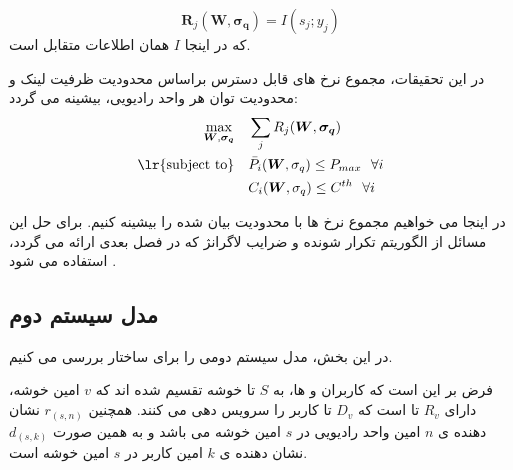 \begin{equation}
\boldsymbol{R}_j (\boldsymbol{W},\boldsymbol{\sigma_q})=I(s_j;y_j) 
\end{equation}
که در اینجا 
$I$
همان اطلاعات متقابل است.


 در این تحقیقات، مجموع نرخ های قابل دسترس براساس محدودیت ظرفیت لینک  و محدودیت توان هر واحد رادیویی، بیشینه می گردد:
\begin{equation}
\begin{aligned}
\max\limits_{\boldsymbol{W},\boldsymbol{\sigma_q}}   \quad &   \sum_j R_j(\boldsymbol{W},\boldsymbol{\sigma_q})\\
\text{\lr{subject to}} \quad  & \bar{P}_i(\boldsymbol{W}, \sigma_q) \leq P_{max} \ \  \forall i \\
&C_i(\boldsymbol{W},\sigma_q)\leq C^{th}  \ \ \forall i \\
\end{aligned}
\end{equation}

 
در اینجا می خواهیم مجموع نرخ ها با محدودیت بیان شده را بیشینه کنیم. برای حل این مسائل از الگوریتم تکرار شونده و ضرایب لاگرانژ که در فصل بعدی ارائه می گردد، استفاده می شود \cite{ul_dl,ulSimeone, Fronthaul, precodSimeone, xia2018power}.

\subsection{مدل سیستم دوم}
در این بخش، مدل سیستم دومی را برای ساختار  بررسی می کنیم. 


فرض بر این است که کاربران و ها، به 
 $S$
 تا خوشه تقسیم شده اند که $v$ امین خوشه،
 دارای $R_v$ تا  است که ${D}_v$ تا کاربر را سرویس دهی می کنند.
همچنین  $r_{(s,n)}$
 نشان دهنده ی $n$ امین واحد رادیویی در $s$ امین خوشه می باشد  و به همین صورت $d_{(s,k)}$
 نشان دهنده ی $k$ امین کاربر در $s$ امین خوشه است.

